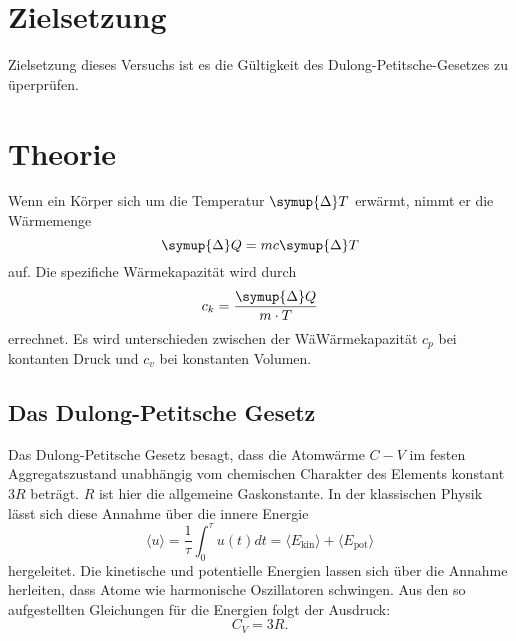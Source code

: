 \section{Zielsetzung}
Zielsetzung dieses Versuchs ist es die Gültigkeit des Dulong-Petitsche-Gesetzes zu üperprüfen.
\section{Theorie}
\label{sec:Theorie}
Wenn ein Körper sich um die Temperatur $\symup{\Delta} T$ erwärmt, nimmt er die Wärmemenge
\begin{equation}
\symup{\Delta} Q = m c \symup{\Delta} T
\end{equation}
auf.
Die spezifiche Wärmekapazität wird durch
\begin{equation}
c_k = \frac{\symup{\Delta} Q}{m \cdot T}
\end{equation}
errechnet.
Es wird unterschieden zwischen der WäWärmekapazität $c_p$ bei kontanten Druck und $c_v$ bei konstanten Volumen.
\subsection{Das Dulong-Petitsche Gesetz}
Das Dulong-Petitsche Gesetz besagt, dass die Atomwärme $C-V$ im festen Aggregatszustand 
unabhängig vom chemischen Charakter des Elements konstant $3R$ beträgt.
$R$ ist hier die allgemeine Gaskonstante.
In der klassischen Physik lässt sich diese Annahme über die innere Energie
 \begin{equation}
 \langle u \rangle = \frac{1}{\tau} \int_0^\tau u(t)dt = \langle E_\text{kin} \rangle + \langle 
E_\text{pot} \rangle
 \end{equation}
hergeleitet.
Die kinetische und potentielle Energien lassen sich über die Annahme herleiten, dass Atome 
wie harmonische Oszillatoren schwingen.
Aus den so aufgestellten Gleichungen für die Energien folgt der Ausdruck:
\begin{equation}
C_V = 3R .
\end{equation}

